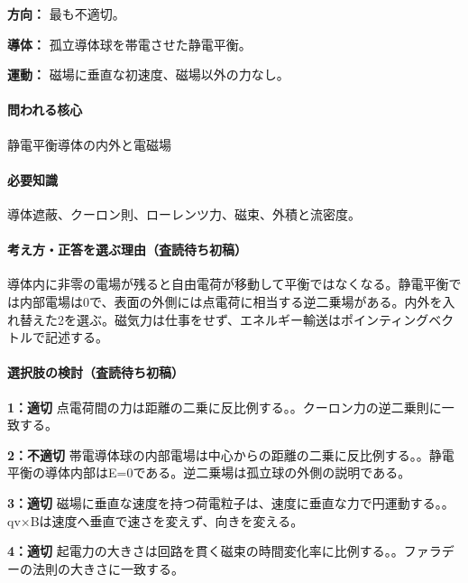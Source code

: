 \noindent\textbf{方向：} 最も不適切。\par

\noindent\textbf{導体：} 孤立導体球を帯電させた静電平衡。\par

\noindent\textbf{運動：} 磁場に垂直な初速度、磁場以外の力なし。\par

\paragraph{問われる核心} 静電平衡導体の内外と電磁場

\paragraph{必要知識} 導体遮蔽、クーロン則、ローレンツ力、磁束、外積と流密度。

\paragraph{考え方・正答を選ぶ理由（査読待ち初稿）} 導体内に非零の電場が残ると自由電荷が移動して平衡ではなくなる。静電平衡では内部電場は0で、表面の外側には点電荷に相当する逆二乗場がある。内外を入れ替えた2を選ぶ。磁気力は仕事をせず、エネルギー輸送はポインティングベクトルで記述する。

\paragraph{選択肢の検討（査読待ち初稿）}\mbox{}\par

\noindent\textbf{1：適切} 点電荷間の力は距離の二乗に反比例する。。クーロン力の逆二乗則に一致する。\par

\noindent\textbf{2：不適切} 帯電導体球の内部電場は中心からの距離の二乗に反比例する。。静電平衡の導体内部はE=\allowbreak{}0である。逆二乗場は孤立球の外側の説明である。\par

\noindent\textbf{3：適切} 磁場に垂直な速度を持つ荷電粒子は、速度に垂直な力で円運動する。。qv×Bは速度へ垂直で速さを変えず、向きを変える。\par

\noindent\textbf{4：適切} 起電力の大きさは回路を貫く磁束の時間変化率に比例する。。ファラデーの法則の大きさに一致する。\par

